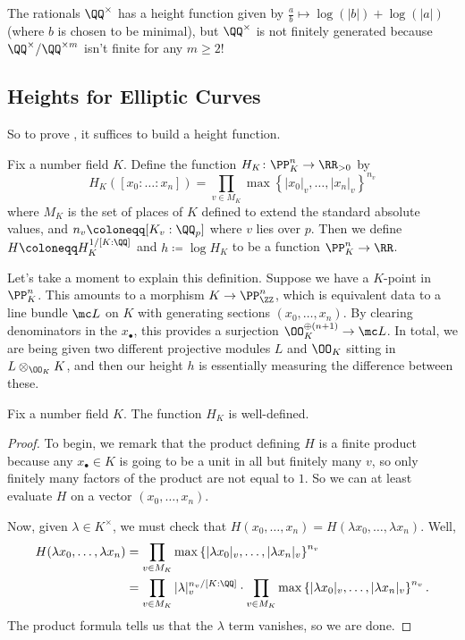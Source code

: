 \documentclass[../notes.tex]{subfiles}
\begin{document}
\begin{remark}
	The rationals $\QQ^\times$ has a height function given by $\frac ab\mapsto\log(|b|)+\log(|a|)$ (where $b$ is chosen to be minimal), but $\QQ^\times$ is not finitely generated because $\QQ^\times/\QQ^{\times m}$ isn't finite for any $m\ge2$!
\end{remark}

\subsection{Heights for Elliptic Curves}
So to prove , it suffices to build a height function.
\begin{definition}
	Fix a number field $K$. Define the function $H_K\colon\PP^n_K\to\RR_{>0}$ by
	\[H_K([x_0:\ldots:x_n])=\prod_{v\in M_K}\max\left\{|x_0|_v,\ldots,|x_n|_v\right\}^{n_v}\]
	where $M_K$ is the set of places of $K$ defined to extend the standard absolute values, and $n_v\coloneqq[K_v:\QQ_p]$ where $v$ lies over $p$. Then we define $H\coloneqq H_K^{1/[K:\QQ]}$ and $h\coloneqq\log H_K$ to be a function $\PP^n_K\to\RR$.
\end{definition}
\begin{remark}
	Let's take a moment to explain this definition. Suppose we have a $K$-point in $\PP^n_K$. This amounts to a morphism $K\to\PP^n_\ZZ$, which is equivalent data to a line bundle $\mc L$ on $K$ with generating sections $(x_0,\ldots,x_n)$. By clearing denominators in the $x_\bullet$, this provides a surjection $\OO_K^{\oplus(n+1)}\to\mc L$. In total, we are being given two different projective modules $L$ and $\OO_K$ sitting in $L\otimes_{\OO_K}K$, and then our height $h$ is essentially measuring the difference between these.
\end{remark}
\begin{lemma}
	Fix a number field $K$. The function $H_K$ is well-defined.
\end{lemma}
\begin{proof}
	To begin, we remark that the product defining $H$ is a finite product because any $x_\bullet\in K$ is going to be a unit in all but finitely many $v$, so only finitely many factors of the product are not equal to $1$. So we can at least evaluate $H$ on a vector $(x_0,\ldots,x_n)$.
	
	Now, given $\lambda\in K^\times$, we must check that $H(x_0,\ldots,x_n)=H(\lambda x_0,\ldots,\lambda x_n)$. Well,
	\begin{align*}
		H(\lambda x_0,\ldots,\lambda x_n) &= \prod_{v\in M_K}\max\left\{|\lambda x_0|_v,\ldots,|\lambda x_n|_v\right\}^{n_v}\\
		&= \prod_{v\in M_K}|\lambda|_v^{n_v/[K:\QQ]}\cdot\prod_{v\in M_K}\max\left\{|\lambda x_0|_v,\ldots,|\lambda x_n|_v\right\}^{n_v}.
	\end{align*}
	The product formula tells us that the $\lambda$ term vanishes, so we are done.
\end{proof}
\end{document}
